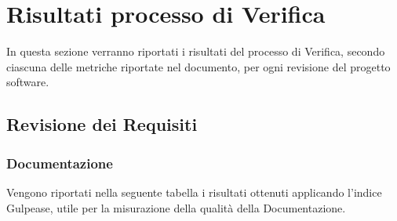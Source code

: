 \appendix
\section{Risultati processo di Verifica}
In questa sezione verranno riportati i risultati del processo di Verifica, secondo ciascuna delle metriche riportate nel documento, per ogni revisione del progetto software.

\subsection{Revisione dei Requisiti}
\subsubsection{Documentazione}
Vengono riportati nella seguente tabella i risultati ottenuti applicando l'indice Gulpease, utile per la misurazione della qualità della Documentazione.